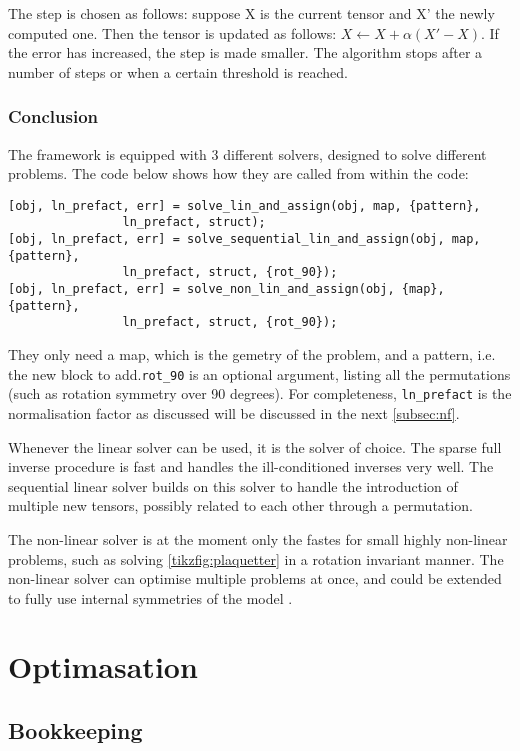 The step is chosen as follows: suppose X is the current tensor and X' the newly computed one. Then the tensor is updated as follows: $X \leftarrow X + \alpha (X'-X)$. If the error has increased, the step is made smaller. The algorithm stops after a number of steps or when a certain threshold is reached.

\subsubsection{Conclusion}

The framework is equipped with 3 different solvers, designed to solve different problems. The code below shows how they are called from within the code:
\begin{verbatim}
[obj, ln_prefact, err] = solve_lin_and_assign(obj, map, {pattern}, 
                ln_prefact, struct);
[obj, ln_prefact, err] = solve_sequential_lin_and_assign(obj, map, {pattern},
                ln_prefact, struct, {rot_90});
[obj, ln_prefact, err] = solve_non_lin_and_assign(obj, {map}, {pattern}, 
                ln_prefact, struct, {rot_90});
\end{verbatim}
They only need a map, which is the gemetry of the problem, and a pattern, i.e. the new block to add.\verb#rot_90# is an optional argument, listing all the permutations (such as rotation symmetry over 90 degrees). For completeness, \verb#ln_prefact# is the normalisation factor as discussed will be discussed in the next \cref{subsec:nf}.

Whenever the linear solver can be used, it is the solver of choice. The sparse full inverse procedure is fast and handles the ill-conditioned inverses very well. The sequential linear solver builds on this solver to handle the introduction of multiple new tensors, possibly related to each other through a permutation.

The non-linear solver is at the moment only the fastes for small highly non-linear problems, such as solving \cref{tikzfig:plaquetter} in a rotation invariant manner. The non-linear solver can optimise multiple problems at once, and could be extended to fully use internal symmetries of the model .

\section{Optimasation}

\subsection{Bookkeeping}

